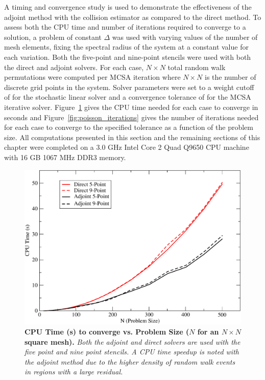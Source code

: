 A timing and convergence study is used to demonstrate the
effectiveness of the adjoint method with the collision estimator as
compared to the direct method. To assess both the CPU time and number
of iterations required to converge to a solution, a problem of
constant $\Delta$ was used with varying values of the number of mesh
elements, fixing the spectral radius of the system at a constant value
for each variation. Both the five-point and nine-point stencils were
used with both the direct and adjoint solvers. For each case, $N
\times N$ total random walk permutations were computed per MCSA
iteration where $N \times N$ is the number of discrete grid points in
the system. Solver parameters were set to a weight cutoff of
 for the stochastic linear solver and a convergence
tolerance of  for the MCSA iterative solver.
Figure~\ref{fig:poisson_cpu_time} gives the CPU time needed for each
case to converge in seconds and Figure~\ref{fig:poisson_iterations}
gives the number of iterations needed for each case to converge to the
specified tolerance as a function of the problem size. All
computations presented in this section and the remaining sections of
this chapter were completed on a 3.0 GHz Intel Core 2 Quad Q9650 CPU
machine with 16 GB 1067 MHz DDR3 memory.
\begin{figure}[t!]
  \centering
  \includegraphics[width=6in,clip]{chapters/mc_background/dir_adj_cpu.pdf}
  \caption{\textbf{CPU Time (s) to converge vs. Problem Size ($N$ for
      an $N \times N$ square mesh).} \textit{Both the adjoint and
      direct solvers are used with the five point and nine point
      stencils. A CPU time speedup is noted with the adjoint method
      due to the higher density of random walk events in regions with
      a large residual.}}
  \label{fig:poisson_cpu_time}
\end{figure}

